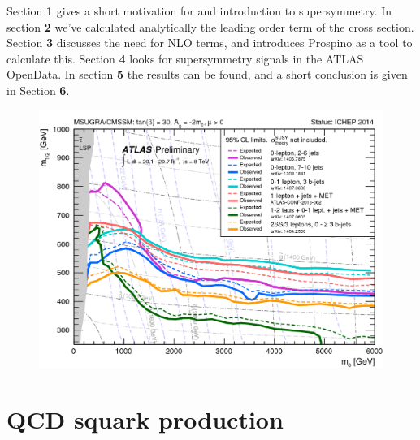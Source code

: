 \documentclass[11pt]{article}
\begin{document}
\begin{flushleft}
Section \textbf{1} gives a short motivation for and introduction to supersymmetry. In section \textbf{2} we've calculated analytically the leading order term of the cross section. Section \textbf{3} discusses the need for NLO terms, and introduces Prospino as a tool to calculate this. Section \textbf{4} looks for supersymmetry signals in the ATLAS OpenData. In section \textbf{5} the results can be found, and a short conclusion is given in Section \textbf{6}.
\end{flushleft}

\begin{figure}[H]
\centering
\includegraphics[scale=0.6]{atlas_preliminary.pdf}
\end{figure}


\section{QCD squark production}
\end{document}
